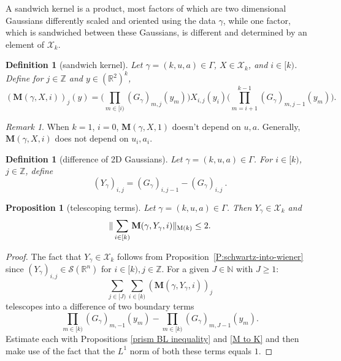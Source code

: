\documentclass[12pt,reqno]{amsart}
\theoremstyle{plain}
\newtheorem{proposition}[theorem]{Proposition}
\newtheorem{definition}[theorem]{Definition}
\numberwithin{equation}{section}
\theoremstyle{remark}
\newtheorem{rem}{Remark}[section]
\newcommand{\using}[1]{}
\newcommand{\Z}{{\mathbb Z}}
\newcommand{\R}{{\mathbb R}}
\newcommand{\N}{{\mathbb N}}
\newcommand{\M}{\mathbf{M}}
\begin{document}
A sandwich kernel is a product, most factors of which are two dimensional Gaussians differently scaled and oriented
using the data $\gamma$, while one
factor, which is  sandwiched between these Gaussians, is different and determined by an element of $\mathcal{X}_k$.
\begin{definition}[sandwich kernel]\label{sandwich kernel}
Let $\gamma=(k,u,a)\in \Gamma$, $X\in \mathcal{X}_k$, and $i\in [k)$. Define for  $j\in \Z$ and $y\in (\R^{2})^k$,
\begin{equation}\label{auto:sandwich-kernel-definition} (\M(\gamma,X,i))_j(y) =  \Big(\prod_{m\in [i)} (G_{\gamma})_{m,j}(y_m) \Big) X_{i,j}(y_i) \Big(\prod_{m=i+1}^{k-1} (G_{\gamma})_{m,j-1}(y_m) \Big).\end{equation}
\end{definition}

\begin{rem}
When $k=1$, $i=0$, $\M(\gamma,X,1)$ doesn't depend on $u,a$.
Generally, $\M(\gamma,X,i)$ does not depend on $u_i, a_i$.
\end{rem}

\begin{definition}[difference of 2D Gaussians]\label{auto:Gaussian-difference-kernel-definition}
Let $\gamma=(k,u,a)\in \Gamma$.  For $i\in [k)$, $j\in \Z$, define
\begin{equation}\label{auto:Gaussian-difference-kernel} (Y_\gamma)_{i,j} = (G_\gamma)_{i,j-1} - (G_\gamma)_{i,j}\ .\end{equation}
\end{definition}

\begin{proposition}[telescoping terms]\label{telescoping terms}\using{P:schwartz-into-wiener}\using{prism BL inequality}\using{M to K}
Let $\gamma=(k,u,a)\in \Gamma$.
Then $Y_\gamma\in \mathcal{X}_k$ and
\begin{equation}\label{auto:telescoping-terms-bound}
    \|\sum_{i\in [k)} \M(\gamma,Y_\gamma,i)\|_{{\rm M}(k)}\le 2.
\end{equation}
\end{proposition}

\begin{proof}
The fact that $Y_\gamma\in \mathcal{X}_k$ follows from Proposition~\ref{P:schwartz-into-wiener} since $(Y_\gamma)_{i,j}\in \mathcal S(\R^n)$ for $i\in [k), j\in \Z$.
For a given $J\in\N$ with $J\ge1$:
\[
\sum_{j\in [J)} \sum_{i\in [k)} (\M(\gamma,Y_\gamma,i))_j
\]
telescopes into a difference of two boundary terms
\[
\prod_{m\in [k)} (G_{\gamma})_{m,-1}(y_m) -\prod_{m\in [k)} (G_{\gamma})_{m,J-1}(y_m).
\]
Estimate each with Propositions \ref{prism BL inequality} and \ref{M to K} and then make use of the fact that the $L^1$ norm of both these terms equals $1$.
\end{proof}
\end{document}
